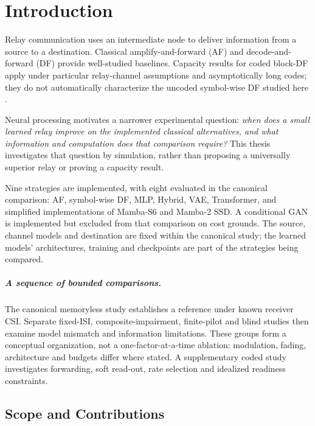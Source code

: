 \chapter{Introduction}\label{sec:introduction}

Relay communication uses an intermediate node to deliver information from a source to a destination. Classical amplify-and-forward (AF) and decode-and-forward (DF) provide well-studied baselines. Capacity results for coded block-DF apply under particular relay-channel assumptions and asymptotically long codes; they do not automatically characterize the uncoded symbol-wise DF studied here \cite{CoverGamal1979RelayChannel,ElGamalKim2011NetworkIT,Laneman2004CooperativeDiversity,RankovWittneben2007HalfDuplexRelay,Nosratinia2004CooperativeCommunication}.

Neural processing motivates a narrower experimental question: \emph{when does a small learned relay improve on the implemented classical alternatives, and what information and computation does that comparison require?} This thesis investigates that question by simulation, rather than proposing a universally superior relay or proving a capacity result.

Nine strategies are implemented, with eight evaluated in the canonical comparison: AF, symbol-wise DF, MLP, Hybrid, VAE, Transformer, and simplified implementations of Mamba-S6 and Mamba-2 SSD. A conditional GAN is implemented but excluded from that comparison on cost grounds. The source, channel models and destination are fixed within the canonical study; the learned models' architectures, training and checkpoints are part of the strategies being compared.

\paragraph{A sequence of bounded comparisons.} The canonical memoryless study establishes a reference under known receiver CSI. Separate fixed-ISI, composite-impairment, finite-pilot and blind studies then examine model mismatch and information limitations. These groups form a conceptual organization, not a one-factor-at-a-time ablation: modulation, fading, architecture and budgets differ where stated. A supplementary coded study investigates forwarding, soft read-out, rate selection and idealized readiness constraints.

\section{Scope and Contributions}\label{sec:system-model-intro}
\label{sec:introduction-scope}

